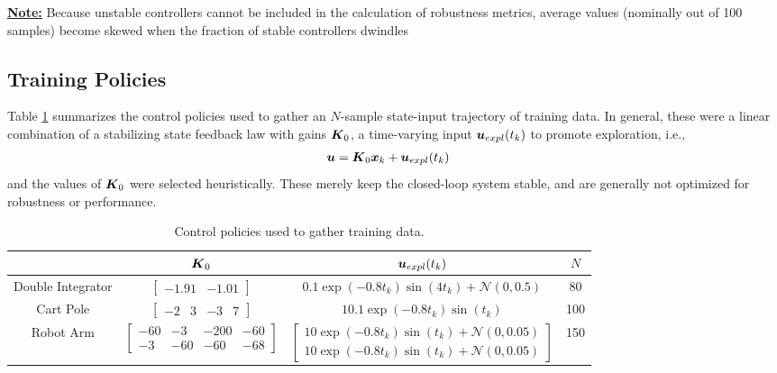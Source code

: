 \underline{\textbf{Note:}} Because unstable controllers cannot be included in the calculation of robustness metrics, average values (nominally out of 100 samples) become skewed when the fraction of stable controllers dwindles

\subsection{Training Policies}
Table \ref{table:training_policies} summarizes the control policies used to gather an $N$-sample state-input trajectory of training data.  In general, these were a linear combination of a stabilizing state feedback law with gains $\vb*{K}_{0}$, a time-varying input $\vb*{u}_{expl}(t_{k})$ to promote exploration, i.e.,
\begin{equation}
\begin{aligned}
	\vb*{u} &= \vb*{K}_{0}\vb*{x}_{k} + \vb*{u}_{expl}(t_{k})
\end{aligned}
\end{equation}
and the values of $\vb*{K}_{0}$ were selected heuristically.   These merely keep the closed-loop system stable, and are generally not optimized for robustness or performance.
\begin{table}[H]
\centering
\begin{tabular}{|c || c | c | c|} 
	\hline
	 & $\vb*{K}_{0}$ & $\vb*{u}_{expl}(t_{k})$ & $N$\\
	\hline\hline
	Double Integrator & $\begin{bmatrix} -1.91 & -1.01\end{bmatrix}$ & $0.1\exp(-0.8t_{k})\sin(4t_{k}) + \mathcal{N}(0, 0.5)$ & 80\\ 
	\hline
	Cart Pole & $\begin{bmatrix}-2 & 3 & -3 & 7\end{bmatrix}$ & $10.1\exp(-0.8t_{k})\sin(t_{k})$ & 100\\
	\hline
	Robot Arm & $\begin{bmatrix}-60 & -3 & -200 & -60\\ -3 & -60 & -60 & -68\end{bmatrix}$ & $\begin{bmatrix}
		10\exp(-0.8t_{k})\sin(t_{k}) + \mathcal{N}(0, 0.05)\\ 10\exp(-0.8t_{k})\sin(t_{k}) + \mathcal{N}(0, 0.05) \end{bmatrix}$ & 150\\
	\hline
\end{tabular}
\caption{Control policies used to gather training data.}
\label{table:training_policies}
\end{table}

